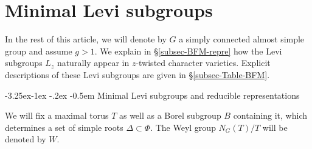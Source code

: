 \documentclass[11pt,oneside,dvipsnames]{amsart}
\makeatletter
\renewcommand\subsection{\@startsection{subsection}{3}{\z@}%
                                     {-3.25ex\@plus -1ex \@minus -.2ex}%
                                     {-0.5em}%
                                     {\normalfont\normalsize\bfseries}}
\theoremstyle{plain}
\theoremstyle{definition}
\theoremstyle{named}
\makeatother
\begin{document}
\section{Minimal Levi subgroups}\label{sec-BFM-Levi}

In the rest of this article, we will denote by $G$ a simply connected almost simple group and assume $g>1$. We explain in \S \ref{subsec-BFM-repre} how the Levi subgroups $L_z$ naturally appear in $z$-twisted character varieties. Explicit descriptions of these Levi subgroups are given in \S \ref{subsec-Table-BFM}.


\subsection{Minimal Levi subgroups and reducible representations}\label{subsec-BFM-repre}\hfill

We will fix a maximal torus $T$ as well as a Borel subgroup $B$ containing it, which determines a set of simple roots $\Delta\subset\Phi$. The Weyl group $N_G(T)/T$ will be denoted by $W$.
\end{document}

